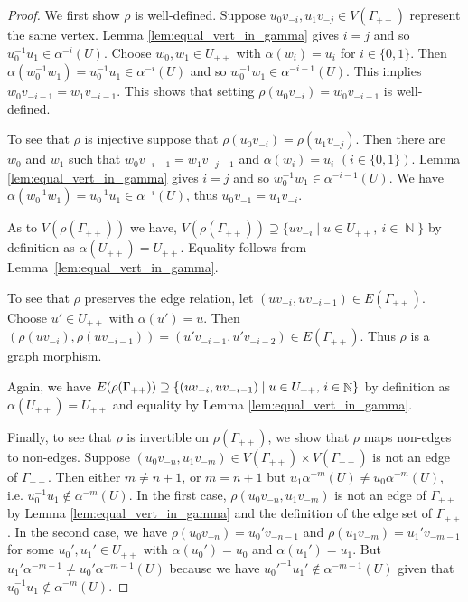 \documentclass{article}
\DeclareMathOperator\bbN{\mathbb{N}}
\theoremstyle{definition}
\begin{document}
\begin{proof}
We first show $\rho$ is well-defined. Suppose $u_0v_{-i}, u_1v_{-j}\in V(\Gamma_{++})$ represent the same vertex. Lemma \ref{lem:equal_vert_in_gamma} gives $i = j$ and so $u_{0}^{-1}u_1\!\in\! \alpha^{-i}(U)$. Choose $w_0,w_1\in U_{++}$ with $\alpha(w_i) = u_i$ for $i\in\{0,1\}$. Then $\alpha(w_0^{-1}w_{1}) = u_{0}^{-1}u_1\in \alpha^{-i}(U)$ and so $w_0^{-1}w_1\in \alpha^{-i-1}(U)$. This implies $w_0v_{-i-1} = w_{1}v_{-i - 1}$. This shows that setting $\rho(u_0v_{-i}) = w_0v_{-i-1}$ is well-defined. 

To see that $\rho$ is injective suppose that $\rho(u_0v_{-i}) = \rho(u_1v_{-j})$. Then there are $w_0$ and $w_1$ such that $w_0v_{-i - 1}=w_{1}v_{-j - 1}$ and $\alpha(w_i) = u_i$ $(i\in\{0,1\})$. Lemma \ref{lem:equal_vert_in_gamma} gives $i = j$ and so $w_0^{-1}w_1\in \alpha^{-i-1}(U)$. We have
$\alpha(w_0^{-1}w_1) = u_0^{-1}u_1\in \alpha^{-i}(U)$, thus $u_0v_{-1} = u_1v_{-i}$.

As to $V(\rho(\Gamma_{++}))$ we have, $V(\rho(\Gamma_{++}))\supseteq\{uv_{-i}\mid u\in U_{++},\ i\in\bbN\}$ by definition as $\alpha(U_{++})=U_{++}$. Equality follows from Lemma~\ref{lem:equal_vert_in_gamma}.

To see that $\rho$ preserves the edge relation, let $(uv_{-i},uv_{-i - 1})\in E(\Gamma_{++})$. Choose $u'\!\in\! U_{++}$ with $\alpha(u')\!=\! u$. Then $(\rho(uv_{-i}),\rho(uv_{-i-1}))\!=\!(u'v_{-i-1}, u'v_{-i-2})\in E(\Gamma_{++})$. Thus $\rho$ is a graph morphism.

Again, we have $E(\rho(\Gamma_{++}))\supseteq\{(uv_{-i},uv_{-i-1})\mid u\in U_{++}\hbox{, }i \in\bbN\}$ by definition as $\alpha(U_{++})=U_{++}$ and equality by Lemma \ref{lem:equal_vert_in_gamma}.

Finally, to see that $\rho$ is invertible on $\rho(\Gamma_{++})$, we show that $\rho$ maps non-edges to non-edges. Suppose $(u_{0}v_{-n},u_{1}v_{-m})\in V(\Gamma_{++})\times V(\Gamma_{++})$ is not an edge of $\Gamma_{++}$. Then either $m\neq n+1$, or $m=n+1$ but $u_{1}\alpha^{-m}(U)\neq u_{0}\alpha^{-m}(U)$, i.e. $u_{0}^{-1}u_{1}\not\in\alpha^{-m}(U)$. In the first case, $\rho(u_{0}v_{-n},u_{1}v_{-m})$ is not an edge of $\Gamma_{++}$ by Lemma \ref{lem:equal_vert_in_gamma} and the definition of the edge set of $\Gamma_{++}$. In the second case, we have $\rho(u_{0}v_{-n})=u_{0}'v_{-n-1}$ and $\rho(u_{1}v_{-m})=u_{1}'v_{-m-1}$ for some $u_{0}',u_{1}'\in U_{++}$ with $\alpha(u_{0}')=u_{0}$ and $\alpha(u_{1}')=u_{1}$. But $u_{1}'\alpha^{-m-1}\neq u_{0}'\alpha^{-m-1}(U)$ because we have $u_{0}'^{-1}u_{1}'\not\in\alpha^{-m-1}(U)$ given that $u_{0}^{-1}u_{1}\not\in\alpha^{-m}(U)$.
\end{proof}
\end{document}
